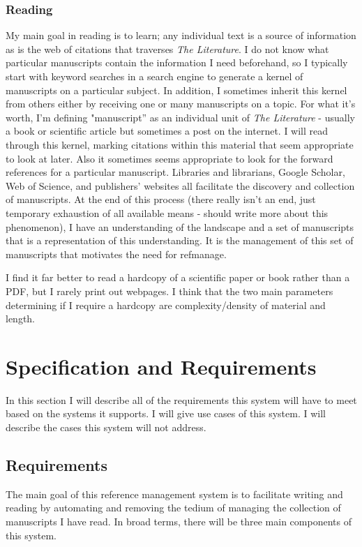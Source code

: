 \documentclass[letterpaper,12pt]{article}
\begin{document}
\subsubsection{Reading}
My main goal in reading is to learn; any individual text is a source of information as is the web of citations that traverses \emph{The Literature}. I do not know what particular manuscripts contain the information I need beforehand, so I typically start with keyword searches in a search engine to generate a kernel of manuscripts on a particular subject. In addition, I sometimes inherit this kernel from others either by receiving one or many manuscripts on a topic. For what it's worth, I'm defining "manuscript'' as an individual unit of \emph{The Literature}  - usually a book or scientific article but sometimes a post on the internet. I will read through this kernel, marking citations within this material that seem appropriate to look at later. Also it sometimes seems appropriate to look for the forward references for a particular manuscript. Libraries and librarians, Google Scholar, Web of Science, and publishers' websites all facilitate the discovery and collection of manuscripts. At the end of this process (there really isn't an end, just temporary exhaustion of all available means - should write more about this phenomenon), I have an understanding of the landscape and a set of manuscripts that is a representation of this understanding. It is the management of this set of manuscripts that motivates the need for refmanage.

I find it far better to read a hardcopy of a scientific paper or book rather than a PDF, but I rarely print out webpages. I think that the two main parameters determining if I require a hardcopy are complexity/density of material and length.









\section{Specification and Requirements}
In this section I will describe all of the requirements this system will have to meet based on the systems it supports. I will give use cases of this system. I will describe the cases this system will not address.

\subsection{Requirements}
The main goal of this reference management system is to facilitate writing and reading by automating and removing the tedium of managing the collection of manuscripts I have read. In broad terms, there will be three main components of this system.
\end{document}
